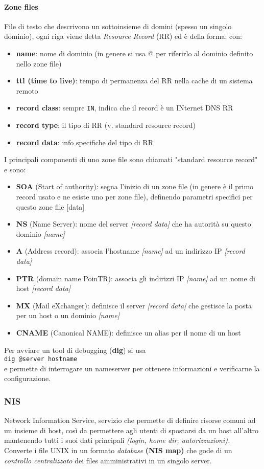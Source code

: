 \documentclass[a4paper,11pt]{article}
\def\code#1{\texttt{#1}}
\def\para#1{\paragraph{#1}\label{#1}}
\def\italic#1{\textit{#1}}
\begin{document}
\para{Zone files}File di testo che descrivono un sottoinsieme di domini (spesso un singolo dominio), ogni riga viene detta \italic{Resource Record} (RR) ed è della forma:
con:
\begin{itemize}
\item \textbf{name}: nome di dominio (in genere si usa @ per riferirlo al dominio definito nello zone file)
\item \textbf{ttl (time to live)}: tempo di permanenza del RR nella cache di un sistema remoto
\item \textbf{record class}: sempre \code{IN}, indica che il record è un INternet DNS RR
\item \textbf{record type}: il tipo di RR (v. standard resource record)
\item \textbf{record data}: info specifiche del tipo di RR
\end {itemize}
I principali componenti di uno zone file sono chiamati "standard resource record" e sono:
\begin{itemize}
\item \textbf{SOA} (Start of authority): segna l'inizio di un zone file (in genere è il primo record usato e ne esiste uno per zone file), definendo parametri specifici per questo zone file [data]
\item \textbf{NS} (Name Server): nome del server \italic{[record data]} che ha autorità su questo dominio \italic{[name]}
\item \textbf{A} (Address record): associa l'hostname \italic{[name]} ad un indirizzo IP \italic{[record data]}
\item \textbf{PTR} (domain name PoinTR): associa gli indirizzi IP \italic{[name]} ad un nome di host \italic{[record data]}
\item \textbf{MX} (Mail eXchanger): definisce il server \italic{[record data]} che gestisce la posta per un host o un dominio \italic{[name]}
\item \textbf{CNAME} (Canonical NAME): definisce un alias per il nome di un host
\end{itemize}
Per avviare un tool di debugging (\textbf{dig}) si usa\\
\code{dig @server hostname}\\
e permette di interrogare un nameserver per ottenere informazioni  e verificarne la configurazione.
\newpage

\subsubsection{NIS}
Network Information Service, servizio che permette di definire risorse comuni ad un insieme di host, così da permettere agli utenti di spostarsi da un host all'altro mantenendo tutti i suoi dati principali \textit{(login, home dir, autorizzazioni).}\\
Converte i file UNIX in un formato \textit{database }\textbf{(NIS map)} che gode di un \textit{controllo centralizzato} dei files amministrativi in un singolo server.\\
\end{document}
